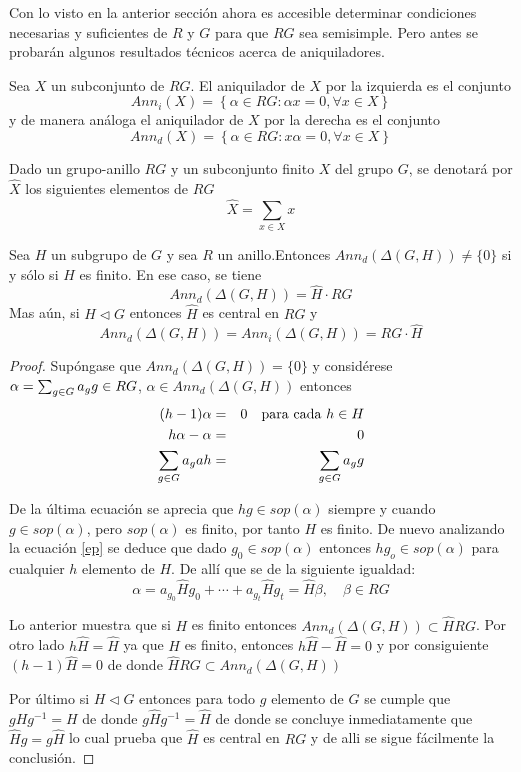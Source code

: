 Con lo visto en la anterior sección ahora es accesible determinar condiciones necesarias y suficientes de $R$ y $G$ para que $RG$ sea semisimple.
Pero antes se probarán algunos resultados técnicos acerca de aniquiladores. 

\begin{definicion}
Sea $X$ un subconjunto de $RG$. El aniquilador de $X$ por la izquierda es el conjunto
\[ Ann_{i}(X) = \left\{ \alpha \in RG : \alpha x = 0, \forall x \in X \right\} \]
y de manera análoga el aniquilador de $X$ por la derecha es el conjunto
\[ Ann_{d}(X) = \left\{ \alpha \in RG : x\alpha  = 0, \forall x \in X \right\} \]

\end{definicion}

\begin{definicion}
Dado un grupo-anillo $RG$ y un subconjunto finito $X$ del grupo $G$, se denotará por $\hat{X}$ los siguientes elementos de $RG$
\[\hat{X} = \sum_{x \in X}x\] 
\end{definicion}

\begin{lema}
Sea $H$ un subgrupo de $G$ y sea $R$ un anillo.Entonces $Ann_{d}(\Delta(G,H)) \neq \{ 0\}$ si y sólo si $H$ es finito. En ese caso, se tiene
$$Ann_d(\Delta(G,H)) = \hat{H} \cdot RG $$
Mas aún, si $H \lhd G$ entonces $\hat{H}$ es central en $RG$ y 
\[Ann_d(\Delta(G,H)) = Ann_i(\Delta(G,H)) = RG \cdot \hat{H}\]
\end{lema}

\begin{proof}
Supóngase que $Ann_d(\Delta(G,H)) = \{ 0\}$ y considérese $\alpha = \sum_{g \in G} a_{g} g \in RG$, $\alpha \in Ann_d(\Delta(G,H))$ entonces
\begin{eqnarray}
(h-1)\alpha &=& 0  \quad \mbox{para cada } h \in H  \\
h\alpha -\alpha &=&  0  \\
\sum_{g \in G} a_gah &=& \sum_{g \in G} a_{g} g \label{ep}
\end{eqnarray}

De la última ecuación se aprecia que $hg \in sop(\alpha)$ siempre y cuando $g \in sop(\alpha)$, pero $sop(\alpha)$ es finito, por tanto $H$ es finito.
De nuevo analizando la ecuación \ref{ep} se deduce que dado $g_0 \in sop(\alpha)$ entonces $hg_o \in sop(\alpha)$ para cualquier $h$ elemento de $H$. De allí que se de la siguiente igualdad:
\[ \alpha = a_{g_0}\hat{H}g_0 + \cdots + a_{g_t}\hat{H}g_t = \hat{H}\beta, \quad \beta \in RG \]

Lo anterior muestra que si $H$ es finito entonces $Ann_d(\Delta(G,H))\subset \hat{H}RG$. Por otro lado $h\hat{H} = \hat{H}$ ya que $H$ es finito, entonces $h\hat{H} -\hat{H} = 0$ y por consiguiente $(h-1)\hat{H} = 0$ de donde $\hat{H}RG \subset Ann_d(\Delta(G,H))  $

Por último si $H \lhd G$ entonces para todo $g$ elemento de $G$ se cumple que $gHg^{-1} = H$ de donde $g\hat{H}g^{-1} = \hat{H}$ de donde se concluye inmediatamente que $\hat{H}g = g\hat{H}$ lo cual prueba que $\hat{H}$ es central en $RG$ y de alli se sigue fácilmente la conclusión. \qedhere
\end{proof}

